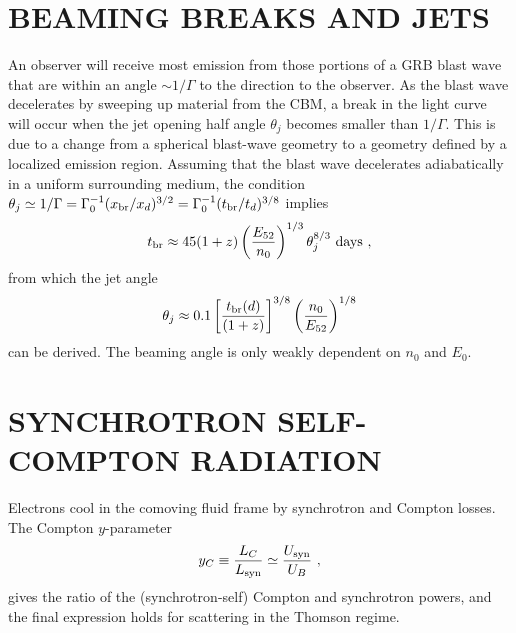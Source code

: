 \documentclass[12pt,a4paper]{article}
\begin{document}
\section{BEAMING BREAKS AND JETS}
\cite{2009herb.book.....D} An observer will receive most emission from those portions of a GRB blast wave that are within an angle $\sim 1/\Gamma$ to the direction to the observer. As the blast wave decelerates by sweeping up material from the CBM, a break in the light curve will occur when the jet opening half angle $\theta_j$ becomes smaller than $1/\Gamma$. This is due to a change from a spherical blast-wave geometry to a geometry defined by a localized emission region. Assuming that the blast wave
decelerates adiabatically in a uniform surrounding medium, the condition $\theta_j \simeq 1/\Gamma = \Gamma_0^{-1} (x_{\rm br}/x_d)^{3/2} = \Gamma_0^{-1} (t_{\rm br}/t_d)^{3/8}$ implies
\begin{align}
t_{\rm br} \approx 45(1+z) \left(\dfrac{E_{52}}{n_0} \right)^{1/3} \theta_j^{8/3} ~ \rm days ~,
\end{align}
from which the jet angle
\begin{align}
\theta_j \approx 0.1 \left[\dfrac{t_{\rm br}(d)}{(1+z)} \right]^{3/8} \left(\dfrac{n_0}{E_{52}} \right)^{1/8}
\end{align}
can be derived. The beaming angle is only weakly dependent on $n_0$ and $E_0$.


















\section{SYNCHROTRON SELF-COMPTON RADIATION}
\cite{2009herb.book.....D} Electrons cool in the comoving fluid frame by synchrotron and Compton losses. The Compton $y$-parameter
\begin{align}
y_C \equiv \dfrac{L_C}{L_{\rm syn}} \simeq \dfrac{U_{\rm syn}}{U_B} ~,
\end{align}
gives the ratio of the (synchrotron-self) Compton and synchrotron powers, and the final expression holds for scattering in the Thomson regime.
\end{document}
